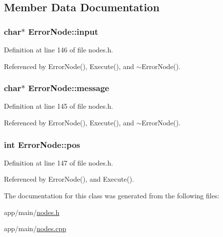 \subsection{Member Data Documentation}
\subsubsection[{\texorpdfstring{input}{input}}]{\setlength{\rightskip}{0pt plus 5cm}char$\ast$ Error\+Node\+::input\hspace{0.3cm}{\ttfamily [private]}}\hypertarget{classErrorNode_ac2cc563162c10fff090113340184bb4b}{}\label{classErrorNode_ac2cc563162c10fff090113340184bb4b}


Definition at line 146 of file nodes.\+h.



Referenced by Error\+Node(), Execute(), and $\sim$\+Error\+Node().

\subsubsection[{\texorpdfstring{message}{message}}]{\setlength{\rightskip}{0pt plus 5cm}char$\ast$ Error\+Node\+::message\hspace{0.3cm}{\ttfamily [private]}}\hypertarget{classErrorNode_abd0f6fbd4876d013fbb7b6a9d5ce673e}{}\label{classErrorNode_abd0f6fbd4876d013fbb7b6a9d5ce673e}


Definition at line 145 of file nodes.\+h.



Referenced by Error\+Node(), Execute(), and $\sim$\+Error\+Node().

\subsubsection[{\texorpdfstring{pos}{pos}}]{\setlength{\rightskip}{0pt plus 5cm}int Error\+Node\+::pos\hspace{0.3cm}{\ttfamily [private]}}\hypertarget{classErrorNode_a2f9577d7885985f6a5671a14d64a75cf}{}\label{classErrorNode_a2f9577d7885985f6a5671a14d64a75cf}


Definition at line 147 of file nodes.\+h.



Referenced by Error\+Node(), and Execute().



The documentation for this class was generated from the following files\+:\begin{DoxyCompactItemize}
\item 
app/main/\hyperlink{nodes_8h}{nodes.\+h}\item 
app/main/\hyperlink{nodes_8cpp}{nodes.\+cpp}\end{DoxyCompactItemize}
